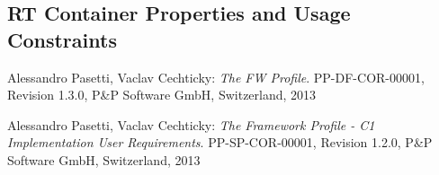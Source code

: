 \documentclass[a4paper,10pt]{article}
\begin{document}
\subsection{RT Container Properties and Usage Constraints}\label{sec:rtPropUsage}


\newpage

\begin{thebibliography}{6}
 
 Alessandro Pasetti, Vaclav Cechticky:
           {\sl The FW Profile}. PP-DF-COR-00001, Revision 1.3.0,
           P\&P Software GmbH, Switzerland, 2013 

 Alessandro Pasetti, Vaclav Cechticky:
           {\sl The Framework Profile - C1 Implementation User Requirements}. 
           PP-SP-COR-00001, Revision 1.2.0,
           P\&P Software GmbH, Switzerland, 2013 

\end{thebibliography}
\end{document}
